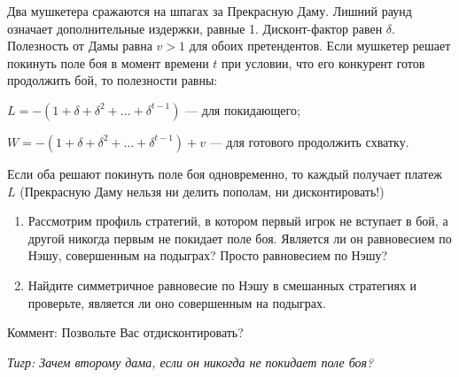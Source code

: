 \begin{problem}[Дуэль-1]
 Два мушкетера сражаются на шпагах за Прекрасную Даму. Лишний раунд
означает дополнительные издержки, равные 1. Дисконт-фактор равен $\delta$.
Полезность от Дамы равна $v>1$ для обоих претендентов. Если мушкетер
решает покинуть поле боя в момент времени $t$ при условии, что его
конкурент готов продолжить бой, то полезности равны: \par
$L=-(1+\delta+\delta^{2}+\ldots +\delta^{t-1})$ --- для покидающего; \par
$W=-(1+\delta+\delta^{2}+\ldots +\delta^{t-1})+v$ --- для готового
продолжить схватку. \par
Если оба решают покинуть поле боя одновременно, то каждый получает
платеж $L$ (Прекрасную Даму нельзя ни делить пополам, ни дисконтировать!) \par
\begin{enumerate}
\item  Рассмотрим профиль стратегий, в котором первый игрок не
вступает в бой, а другой никогда первым не покидает поле боя. Является ли
он равновесием по Нэшу, совершенным на подыграх? Просто равновесием
по Нэшу? \par
\item Найдите симметричное равновесие по Нэшу в смешанных стратегиях
и проверьте, является ли оно совершенным на подыграх.
\end{enumerate}
\begin{rem}
Коммент: Позвольте Вас отдисконтировать?

{\it Тигр: Зачем второму дама, если он никогда не покидает поле боя?}
\end{rem}


\begin{sol}

\end{sol}
\end{problem}




